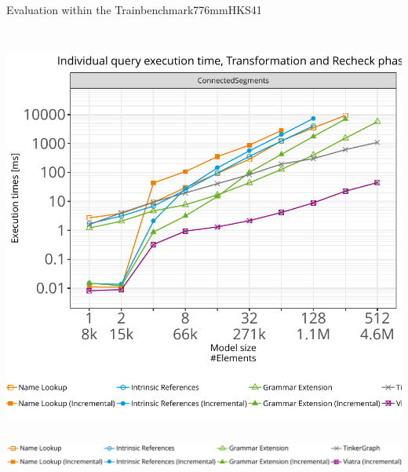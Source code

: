 \documentclass[rgb,cdgeometry=no,cd=true,cdhead=bicolor,cdfont=false,cdfoot=color,cdfont=nodin,english,paper=A0,fontsize=32pt,DIV=25,usegeometry]{tudscrposter}
\begin{document}
\begin{contentbox}[280mm]{Evaluation within the Trainbenchmark}{776mm}{HKS41}
\begin{minipage}{540mm}
\begin{minipage}{170mm}
\\[4mm]
\noindent\includegraphics[height=13cm,keepaspectratio,clip,trim=2.3cm 2.2cm 0cm 1.35cm]{images/repair-Transformation-and-Recheck-ConnectedSegments.pdf}
\end{minipage}
\includegraphics[width=530mm]{images/diagram-legend}
\end{minipage}
\clinesep%
\end{contentbox}
\begin{literaturebox}
\begingroup
\renewcommand{\section}[2]{}%


\endgroup
\end{literaturebox}



\end{document}
